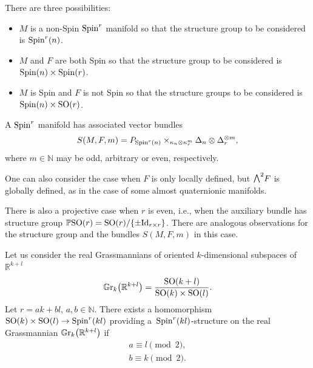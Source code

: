 \documentclass[pdftex]{sigma}
\newcommand{\ext}{\raise1pt\hbox{\small$\bigwedge$}}
\numberwithin{equation}{section}
\begin{document}
\begin{Remark}There are three possibilities:
\begin{itemize}\itemsep=0pt
 \item $M$ is a non-Spin ${\rm Spin}^r$ manifold so that the structure group to be considered is ${\rm Spin}^r(n)$.
 \item $M$ and $F$ are both Spin so that the structure group to be considered is ${\rm Spin}(n)\times {\rm Spin}(r)$.
 \item $M$ is Spin and $F$ is not Spin so that the structure groups to be considered is ${\rm Spin}(n)\times {\rm SO}(r)$.
\end{itemize}
A ${\rm Spin}^r$ manifold has associated vector bundles
\begin{gather*} S(M,F,m)=P_{{\rm Spin}^r(n)}\times_{\kappa_n\otimes\kappa_r^{m}}\Delta_n\otimes\Delta_r^{\otimes m},\end{gather*}
where $m\in\mathbb{N}$ may be odd, arbitrary or even, respectively.
\end{Remark}

\begin{Remark} One can also consider the case when $F$ is only locally defined, but $\ext^2 F$ is globally defined, as in the case of some almost quaternionic manifolds.
\end{Remark}

\begin{Remark} There is also a projective case when $r$ is even, i.e., when the auxiliary bundle has structure group $\mathbb{P}{\rm SO}(r)={\rm SO}(r)/\{\pm {\rm Id}_{r\times r}\}$. There are analogous observations for the structure group and the bundles $S(M,F,m)$ in this case.
\end{Remark}

\begin{Example} Let us consider the real Grassmannians of oriented $k$-dimensional subspaces of $\mathbb{R}^{k+l}$
\begin{gather*}\mathbb{G}{\rm r}_k\big(\mathbb{R}^{k+l}\big)={{\rm SO}(k+l)\over {\rm SO}(k)\times {\rm SO}(l)}.\end{gather*}
Let $r = ak + bl$, $a,b\in\mathbb{N}$. There exists a homomorphism ${\rm SO}(k)\times {\rm SO}(l)\rightarrow {\rm Spin}^{r}(kl)$ providing a~${\rm Spin}^{r}(kl)$-structure on the real Grassmannian $\mathbb{G}{\rm r}_k\big(\mathbb{R}^{k+l}\big)$ if
\begin{gather*}
 a \equiv l \pmod 2,\\
b \equiv k \pmod 2.
\end{gather*}
\end{Example}
\end{document}
